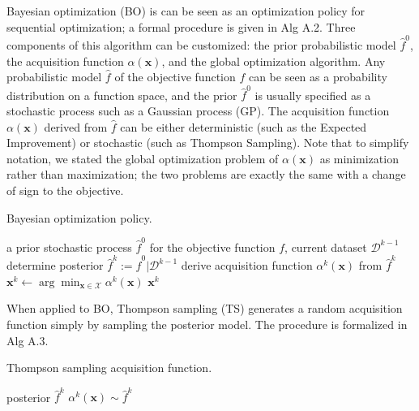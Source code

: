 \documentclass{article}
\begin{document}
Bayesian optimization (BO) is can be seen as an optimization policy for
sequential optimization; a formal procedure is given in Alg A.2. Three
components of this algorithm can be customized: the prior probabilistic
model $\widehat{f}^0$, the acquisition function
$\alpha(\mathbf{x})$, and the global optimization algorithm. Any
probabilistic model $\widehat{f}$ of the objective function $f$ can
be seen as a probability distribution on a function space, and the prior
$\widehat{f}^0$ is usually specified as a stochastic process such as a
Gaussian process (GP). The acquisition function $\alpha(\mathbf{x})$
derived from $\widehat{f}$ can be either deterministic (such as the
Expected Improvement) or stochastic (such as Thompson Sampling). Note
that to simplify notation, we stated the global optimization problem of
$\alpha(\mathbf{x})$ as minimization rather than maximization; the two
problems are exactly the same with a change of sign to the objective.

\begin{algorithm}[h]
  \caption{Bayesian optimization policy.}
  \label{alg:BOpolicy}
  \begin{algorithmic}[1] %
    \Input a prior stochastic process $\widehat{f}^0$ for the objective function $f$, current dataset $\mathcal{D}^{k-1}$
    \State determine posterior
    $\widehat{f}^k := \widehat{f}^0 | \mathcal{D}^{k-1}$
    \State derive acquisition function $\alpha^k(\mathbf{x})$ from
    $\widehat{f}^k$
    \State $\mathbf{x}^k \gets \arg\min_{\mathbf{x} \in \mathcal{X}} \alpha^k(\mathbf{x})$
    \State \Return $\mathbf{x}^k$
  \end{algorithmic}
\end{algorithm}

When applied to BO, Thompson sampling (TS) generates a random
acquisition function simply by sampling the posterior model. The
procedure is formalized in Alg A.3.

\begin{algorithm}[h]
  \caption{Thompson sampling acquisition function.}
  \label{alg:TS}
  \begin{algorithmic}[1] %
    \Input posterior $\widehat{f}^k$
    \State \Return $\alpha^k(\mathbf{x}) \sim \widehat{f}^k$
  \end{algorithmic}
\end{algorithm}
\end{document}
